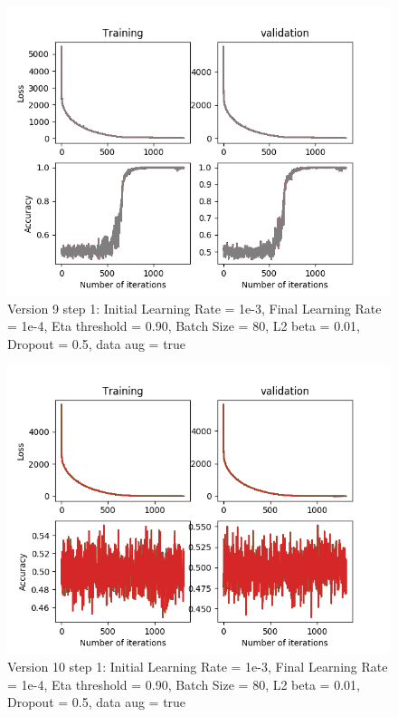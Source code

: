 \documentclass[12pt,reqno]{amsart}
\numberwithin{equation}{section}
\begin{document}
\begin{enumerate}
\begin{figure}[H]
\centering
\includegraphics[scale=0.6]{data_liquid10_version9_step1}
\caption{Version 9 step 1: Initial Learning Rate = 1e-3, Final Learning Rate = 1e-4, Eta threshold = 0.90, Batch Size = 80, L2 beta = 0.01, Dropout = 0.5, data aug = true}
\end{figure}

\begin{figure}[H]
\centering
\includegraphics[scale=0.6]{data_liquid10_version10_step1}
\caption{Version 10 step 1: Initial Learning Rate = 1e-3, Final Learning Rate = 1e-4, Eta threshold = 0.90, Batch Size = 80, L2 beta = 0.01, Dropout = 0.5, data aug = true}
\end{figure}


\end{enumerate}
\end{document}
